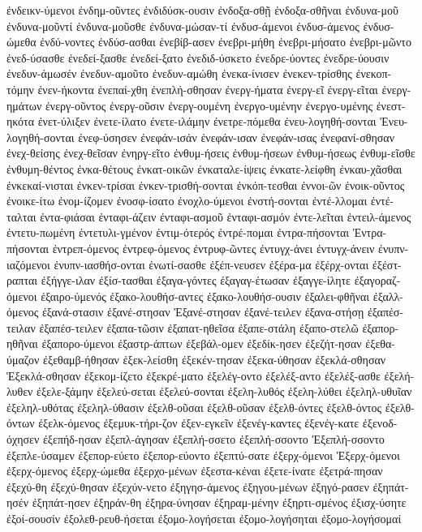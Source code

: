 {ἐνδεικν-ύμενοι
ἐνδημ-οῦντες
ἐνδιδύσκ-ουσιν
ἐνδοξα-σθῇ
ἐνδοξα-σθῆναι
ἐνδυνα-μοῦ
ἐνδυνα-μοῦντί
ἐνδυνα-μοῦσθε
ἐνδυνα-μώσαν-τί
ἐνδυσ-άμενοι
ἐνδυσ-άμενος
ἐνδυσ-ώμεθα
ἐνδύ-νοντες
ἐνδύσ-ασθαι
ἐνεβίβ-ασεν
ἐνεβρι-μήθη
ἐνεβρι-μήσατο
ἐνεβρι-μῶντο
ἐνεδ-ύσασθε
ἐνεδεί-ξασθε
ἐνεδεί-ξατο
ἐνεδιδ-ύσκετο
ἐνεδρε-ύοντες
ἐνεδρε-ύουσιν
ἐνεδυν-άμωσέν
ἐνεδυν-αμοῦτο
ἐνεδυν-αμώθη
ἐνεκα-ίνισεν
ἐνεκεν-τρίσθης
ἐνεκοπ-τόμην
ἐνεν-ήκοντα
ἐνεπαί-χθη
ἐνεπλή-σθησαν
ἐνεργ-ήματα
ἐνεργ-εῖ
ἐνεργ-εῖται
ἐνεργ-ημάτων
ἐνεργ-οῦντος
ἐνεργ-οῦσιν
ἐνεργ-ουμένη
ἐνεργο-υμένην
ἐνεργο-υμένης
ἐνεστ-ηκότα
ἐνετ-ύλιξεν
ἐνετε-ίλατο
ἐνετε-ιλάμην
ἐνετρε-πόμεθα
ἐνευ-λογηθή-σονται
Ἐνευ-λογηθή-σονται
ἐνεφ-ύσησεν
ἐνεφάν-ισάν
ἐνεφάν-ισαν
ἐνεφάν-ισας
ἐνεφανί-σθησαν
ἐνεχ-θείσης
ἐνεχ-θεῖσαν
ἐνηργ-εῖτο
ἐνθυμ-ήσεις
ἐνθυμ-ήσεων
ἐνθυμ-ήσεως
ἐνθυμ-εῖσθε
ἐνθυμη-θέντος
ἐνκα-θέτους
ἐνκατ-οικῶν
ἐνκαταλε-ίψεις
ἐνκατε-λείφθη
ἐνκαυ-χᾶσθαι
ἐνκεκαί-νισται
ἐνκεν-τρίσαι
ἐνκεν-τρισθή-σονται
ἐνκόπ-τεσθαι
ἐννοι-ῶν
ἐνοικ-οῦντος
ἐνοικε-ίτω
ἐνομ-ίζομεν
ἐνοσφ-ίσατο
ἐνοχλο-ύμενοι
ἐνστή-σονται
ἐντέ-λλομαι
ἐντέ-ταλται
ἐντα-φιάσαι
ἐνταφι-άζειν
ἐνταφι-ασμοῦ
ἐνταφι-ασμόν
ἐντε-λεῖται
ἐντειλ-άμενος
ἐντετυ-πωμένη
ἐντετυλι-γμένον
ἐντιμ-ότερός
ἐντρέ-πομαι
ἐντρα-πήσονται
Ἐντρα-πήσονται
ἐντρεπ-όμενος
ἐντρεφ-όμενος
ἐντρυφ-ῶντες
ἐντυγχ-άνει
ἐντυγχ-άνειν
ἐνυπν-ιαζόμενοι
ἐνυπν-ιασθήσ-ονται
ἐνωτί-σασθε
ἐξέπ-νευσεν
ἐξέρα-μα
ἐξέρχ-ονται
ἐξέστ-ραπται
ἐξήγγε-ιλαν
ἐξίσ-τασθαι
ἐξαγα-γόντες
ἐξαγαγ-έτωσαν
ἐξαγγε-ίλητε
ἐξαγοραζ-όμενοι
ἐξαιρο-ύμενός
ἐξακο-λουθήσ-αντες
ἐξακο-λουθήσ-ουσιν
ἐξαλει-φθῆναι
ἐξαλλ-όμενος
ἐξανά-στασιν
ἐξανέ-στησαν
Ἐξανέ-στησαν
ἐξανέ-τειλεν
ἐξανα-στήσῃ
ἐξαπέσ-τειλαν
ἐξαπέσ-τειλεν
ἐξαπα-τῶσιν
ἐξαπατ-ηθεῖσα
ἐξαπε-στάλη
ἐξαπο-στελῶ
ἐξαπορ-ηθῆναι
ἐξαπορο-ύμενοι
ἐξαστρ-άπτων
ἐξεβάλ-ομεν
ἐξεδίκ-ησεν
ἐξεζήτ-ησαν
ἐξεθα-ύμαζον
ἐξεθαμβ-ήθησαν
ἐξεκ-λείσθη
ἐξεκέν-τησαν
ἐξεκα-ύθησαν
ἐξεκλά-σθησαν
Ἐξεκλά-σθησαν
ἐξεκομ-ίζετο
ἐξεκρέ-ματο
ἐξελέγ-οντο
ἐξελέξ-αντο
ἐξελέξ-ασθε
ἐξελή-λυθεν
ἐξελε-ξάμην
ἐξελεύ-σεται
ἐξελεύ-σονται
ἐξελη-λυθός
ἐξελη-λύθει
ἐξεληλ-υθυῖαν
ἐξεληλ-υθότας
ἐξεληλ-ύθασιν
ἐξελθ-οῦσαι
ἐξελθ-οῦσαν
ἐξελθ-όντες
ἐξελθ-όντος
ἐξελθ-όντων
ἐξελκ-όμενος
ἐξεμυκ-τήρι-ζον
ἐξεν-εγκεῖν
ἐξενέγ-καντες
ἐξενέγ-κατε
ἐξενοδ-όχησεν
ἐξεπήδ-ησαν
ἐξεπλ-άγησαν
ἐξεπλή-σσετο
ἐξεπλή-σσοντο
Ἐξεπλή-σσοντο
ἐξεπλε-ύσαμεν
ἐξεπορ-εύετο
ἐξεπορ-εύοντο
ἐξεπτύ-σατε
ἐξερχ-όμενοι
Ἐξερχ-όμενοι
ἐξερχ-όμενος
ἐξερχ-ώμεθα
ἐξερχο-μένων
ἐξεστα-κέναι
ἐξετε-ίνατε
ἐξετρά-πησαν
ἐξεχύ-θη
ἐξεχύ-θησαν
ἐξεχύν-νετο
ἐξηγησ-άμενος
ἐξηγου-μένων
ἐξηγό-ρασεν
ἐξηπάτ-ησέν
ἐξηπάτ-ησεν
ἐξηράν-θη
ἐξηρα-ύνησαν
ἐξηραμ-μένην
ἐξηρτι-σμένος
ἐξισχ-ύσητε
ἐξοί-σουσίν
ἐξολεθ-ρευθ-ήσεται
ἐξομο-λογήσεται
ἐξομο-λογήσηται
ἐξομο-λογήσομαί
}
